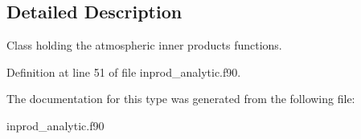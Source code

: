 \subsection{Detailed Description}
Class holding the atmospheric inner products functions. 

Definition at line 51 of file inprod\+\_\+analytic.\+f90.



The documentation for this type was generated from the following file\+:\begin{DoxyCompactItemize}
\item 
inprod\+\_\+analytic.\+f90\end{DoxyCompactItemize}
